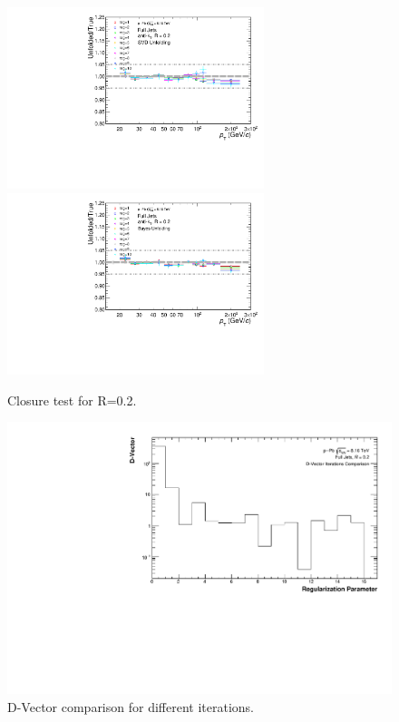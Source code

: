 \begin{figure}
    \centering
    \begin{multicols}{2}
            \includegraphics[width=7.5cm]{figures/pPbFigures/UnfoldingComparisons/Closure/RatioClosure1DSvd_R02.pdf}
        \vfill\null
        \columnbreak
            \includegraphics[width=7.5cm]{figures/pPbFigures/UnfoldingComparisons/Closure/RatioClosure1DBayes_R02.pdf}
        \vfill\null
    \end{multicols}
    \caption{Closure test for R=0.2.}
    \label{fig:ClosurepPb}
\end{figure}

\begin{figure}
    \centering
    \includegraphics[width=15cm]{figures/pPbFigures/DVector/DVector_R02.pdf}
    \caption{D-Vector comparison for different iterations.}
    \label{fig:DVectorpPb}
\end{figure}

